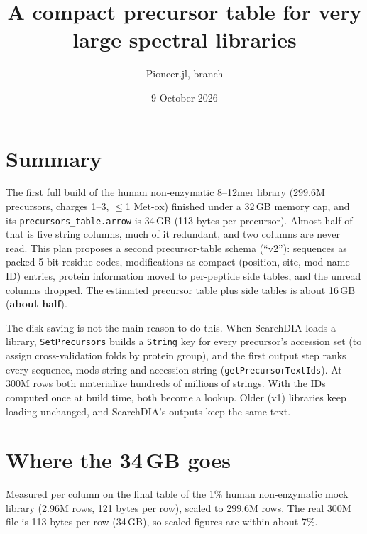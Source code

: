\documentclass[10pt]{article}
\title{A compact precursor table for very large spectral libraries}
\author{Pioneer.jl, branch \code{feat/immunopeptidomics}}
\date{9 October 2026}
\newcommand{\code}[1]{\texttt{#1}}
\begin{document}
\maketitle
\sloppy

\section*{Summary}
The first full build of the human non-enzymatic 8--12mer library (299.6M precursors, charges 1--3, $\le$1 Met-ox)
finished under a 32\,GB memory cap, and its \code{precursors\_table.arrow} is 34\,GB (113 bytes per precursor).
Almost half of that is five string columns, much of it redundant, and two columns are never read. This plan
proposes a second precursor-table schema (``v2''): sequences as packed 5-bit residue codes, modifications as compact
(position, site, mod-name ID) entries, protein information moved to per-peptide side tables, and the unread columns
dropped. The estimated precursor table plus side tables is about 16\,GB (\textbf{about half}).

The disk saving is not the main reason to do this. When SearchDIA loads a library, \code{SetPrecursors} builds a
\code{String} key for every precursor's accession set (to assign cross-validation folds by protein group), and the
first output step ranks every sequence, mods string and accession string (\code{getPrecursorTextIds}). At 300M rows
both materialize hundreds of millions of strings. With the IDs computed once at build time, both become a lookup.
Older (v1) libraries keep loading unchanged, and SearchDIA's outputs keep the same text.

\section{Where the 34\,GB goes}
Measured per column on the final table of the 1\% human non-enzymatic mock library (2.96M rows, 121 bytes per row),
scaled to 299.6M rows. The real 300M file is 113 bytes per row (34\,GB), so scaled figures are within about 7\%.
\end{document}
